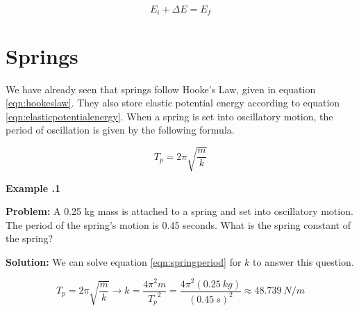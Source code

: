 	
		\begin{mdframed}[backgroundcolor=orange!20!white]
		\begin{equation}
			E_i + \Delta E = E_f
			\label{equation:conservationofenergy}
		\end{equation}
	\end{mdframed}
	
	
	
	
	
	
	
	
	
	
	
	
	
	
	\newpage
	\section{Springs}
	
	We have already seen that springs follow Hooke's Law, given in equation \ref{eqn:hookeslaw}.  They also store elastic potential energy according to equation \ref{eqn:elasticpotentialenergy}.  When a spring is set into oscillatory motion, the period of \gls{oscillation} is given by the following formula.
	
		\begin{mdframed}[backgroundcolor=orange!20!white]
		\begin{equation}
		T_p = 2 \pi \sqrt{\frac{m}{k}}
		\label{eqn:springperiod}
		\end{equation}
	\end{mdframed}
	
	
	\begin{mdframed}[backgroundcolor=blue!10!white]
		\begin{center}
			
			
			\textbf{Example \thesection.1}	
		\end{center}
		
		\textbf{Problem: } A 0.25 kg mass is attached to a spring and set into oscillatory motion.  The period of the spring's motion is 0.45 seconds.  What is the spring constant of the spring? 
		
		\vspace{0.1in}
		
		\textbf{Solution:} 
		We can solve equation \ref{eqn:springperiod} for $k$ to answer this question.  
		
		\begin{equation*}
				T_p = 2 \pi \sqrt{\frac{m}{k}} \longrightarrow k = \frac{4\pi^2m}{{T_p}^2}  = \frac{4\pi^2(\SI{0.25}{kg})}{(\SI{0.45}{s})^2} \approx \SI{48.739}{N/m}
		\end{equation*}
		
		
		
		
		
	\end{mdframed}
	
